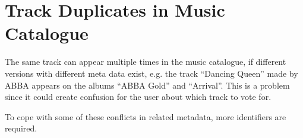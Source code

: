 \section{Track Duplicates in Music Catalogue}
\label{sec:duplicates}
The same track can appear multiple times in the music catalogue, if different versions with different meta data exist, e.g. the track \enquote{Dancing Queen} made by ABBA appears on the albums \enquote{ABBA Gold} and \enquote{Arrival}. This is a problem since it could create confusion for the user about which track to vote for.

To cope with some of these conflicts in related metadata, more identifiers are required. 